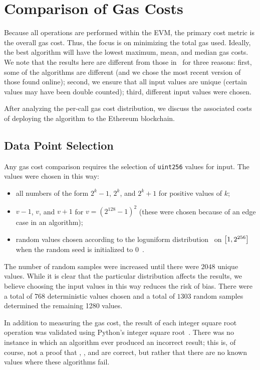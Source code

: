 \section{Comparison of Gas Costs}
\label{sec:comparison}

Because all operations are performed within the EVM,
the primary cost metric is the overall gas cost.
Thus, the focus is on minimizing the total gas used.
Ideally, the best algorithm will have the lowest maximum, mean, and median
gas costs.
We note that the results here are different from those
in~\cite{EfficientIsqrt} for three reasons:
first, some of the algorithms are different
(and we chose the most recent version of those found online);
second, we ensure that all input values are unique
(certain values may have been double counted);
third, different input values were chosen.

After analyzing the per-call gas cost distribution,
we discuss the associated costs of deploying the algorithm
to the Ethereum blockchain.


\subsection{Data Point Selection}

Any gas cost comparison requires the selection of \texttt{uint256}
values for input.
The values were chosen in this way:

\begin{itemize}
\item all numbers of the form $2^{k}-1$, $2^{k}$, and $2^{k}+1$
    for positive values of $k$;
\item $v-1$, $v$, and $v+1$ for $v = (2^{128}-1)^{2}$
    (these were chosen because of an edge case in an algorithm);
\item random values chosen according to the
    loguniform distribution~\cite{ScipyLoguniform}
    on $\left[ 1, 2^{256} \right]$ when the random seed
    is initialized to $0$~\cite{NumpyRandomSeed}.
\end{itemize}

\noindent
The number of random samples were increased until
there were $2048$ unique values.
While it is clear that the particular distribution affects the results,
we believe choosing the input values in this way reduces
the risk of bias.
There were a total of $768$ deterministic values chosen
and a total of $1303$ random samples determined
the remaining 1280 values.

In addition to measuring the gas cost,
the result of each integer square root operation was
validated using
Python's integer square root~\cite{PythonIsqrt,PythonIsqrtLink}.
There was no instance in which an algorithm ever produced an incorrect result;
this is, of course, not a proof that 
\prb{}, \OpenZeppelin{}, and \abdk{} are correct,
but rather that there are no known values where these algorithms fail.


